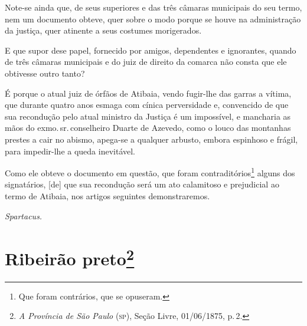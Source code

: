 Note-se ainda que, de seus superiores e das três câmaras municipais do
seu termo, nem um documento obteve, quer sobre o modo porque se houve na
administração da justiça, quer atinente a seus costumes morigerados.

E que supor dese papel, fornecido por amigos, dependentes e ignorantes,
quando de três câmaras municipais e do juiz de direito da comarca não
consta que ele obtivesse outro tanto?

É porque o atual juiz de órfãos de Atibaia, vendo fugir-lhe das garras a
vítima, que durante quatro anos esmaga com cínica perversidade e,
convencido de que sua recondução pelo atual ministro da Justiça é um
impossível, e mancharia as mãos do exmo.\,sr.\,conselheiro Duarte de
Azevedo, como o louco das montanhas prestes a cair no abismo, apega-se a
qualquer arbusto, embora espinhoso e frágil, para impedir-lhe a queda
inevitável.

Como ele obteve o documento em questão, que foram
contraditórios\footnote{ Que foram contrários, que se opuseram.} alguns
dos signatários, {[}de{]} que sua recondução será um ato calamitoso e
prejudicial ao termo de Atibaia, nos artigos seguintes demonstraremos.

\emph{Spartacus.}

\chapter{Ribeirão preto\footnote{\emph{A Província de São Paulo} (\textsc{sp}), Seção Livre,
  01/06/1875, p.\,2.}} %

